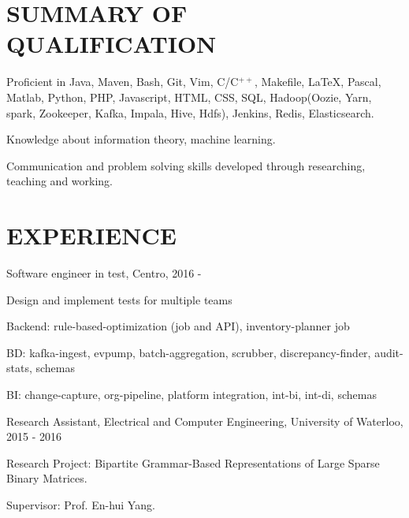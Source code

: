 \documentclass{res}
\newcommand{\parsp}{\vspace{-0.7\baselineskip}}
\newcommand{\additemindent}{\addtolength{\itemindent}{1em}}
\begin{document}
\begin{resume}

\parsp
\section{SUMMARY OF QUALIFICATION}
	\begin{asparaitem}
		\item 	Proficient in Java, Maven, Bash, Git, Vim, C/C$^{++}$, Makefile, \LaTeX, Pascal, Matlab, Python, PHP, Javascript, HTML, CSS, SQL, Hadoop(Oozie, Yarn, spark, Zookeeper, Kafka, Impala, Hive, Hdfs), Jenkins, Redis, Elasticsearch.
		\item 	Knowledge about information theory, machine learning.
		\item 	Communication and problem solving skills developed through researching, teaching and working.
	\end{asparaitem}


\parsp
\section{EXPERIENCE}
\begin{asparaitem}
	\item Software engineer in test, Centro, 2016 - 
		\begin{asparaitem}
			\additemindent
			\item Design and implement tests for multiple teams
			\begin{asparaitem}
				\additemindent
				\item Backend: rule-based-optimization (job and API), inventory-planner job
				\item BD: kafka-ingest, evpump, batch-aggregation, scrubber, discrepancy-finder, audit-stats, schemas
				\item BI: change-capture, org-pipeline, platform integration, int-bi, int-di, schemas
			\end{asparaitem}
		\end{asparaitem}

	\item Research Assistant, Electrical and Computer Engineering, University of Waterloo, 2015 - 2016
		\begin{asparaitem}
			\additemindent
			\item Research Project: Bipartite Grammar-Based Representations of Large Sparse Binary Matrices.
			\item Supervisor: Prof. En-hui Yang. 
		\end{asparaitem}


\end{asparaitem}
\end{resume}
\end{document}
